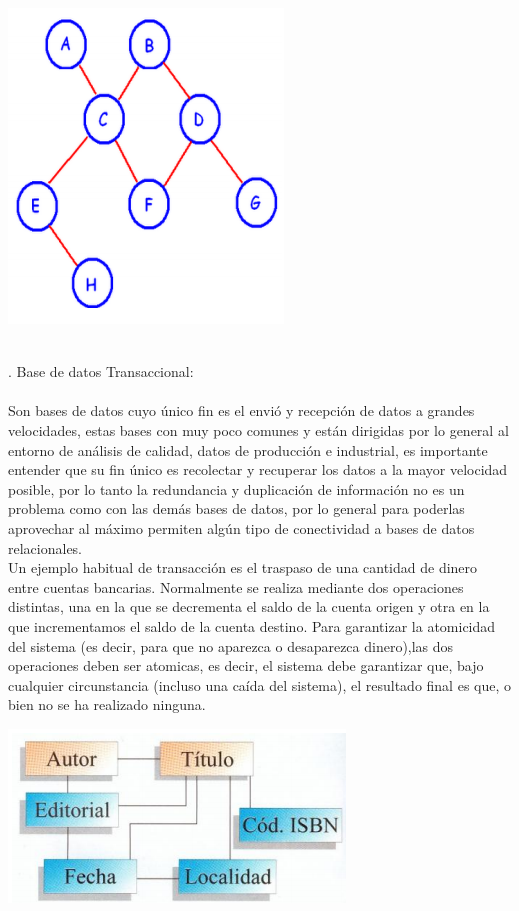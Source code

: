 \documentclass[12pt,letterpaper]{article}
\begin{document}
\begin{center} 
\includegraphics[scale=1]{IMAGENES/red.png} 
\end{center}
\\
. Base de datos Transaccional:  \\ \\
Son bases de datos cuyo único fin es el envió y recepción de datos a grandes velocidades, estas bases con muy poco comunes y están dirigidas por lo general al entorno de análisis de calidad, datos de producción e industrial, es importante entender que su fin único es recolectar y recuperar los datos a la mayor velocidad posible, por lo tanto la redundancia y duplicación de información no es un problema como con las demás bases de datos, por lo general para poderlas aprovechar al máximo permiten algún tipo de conectividad a bases de datos relacionales. \\
Un ejemplo habitual de transacción es el traspaso de una cantidad de dinero entre cuentas bancarias. Normalmente se realiza mediante dos operaciones distintas, una en la que se decrementa el saldo de la cuenta origen y otra en la que incrementamos el saldo de la cuenta destino. Para garantizar la atomicidad del sistema (es decir, para que no aparezca o desaparezca dinero),las dos operaciones deben ser atomicas, es decir, el sistema debe garantizar que, bajo cualquier circunstancia (incluso una caída del sistema), el resultado final es que, o bien no se ha realizado ninguna.

\begin{center} 
\includegraphics[scale=1]{IMAGENES/transaccional.png} 
\end{center}
\\
\end{document}
